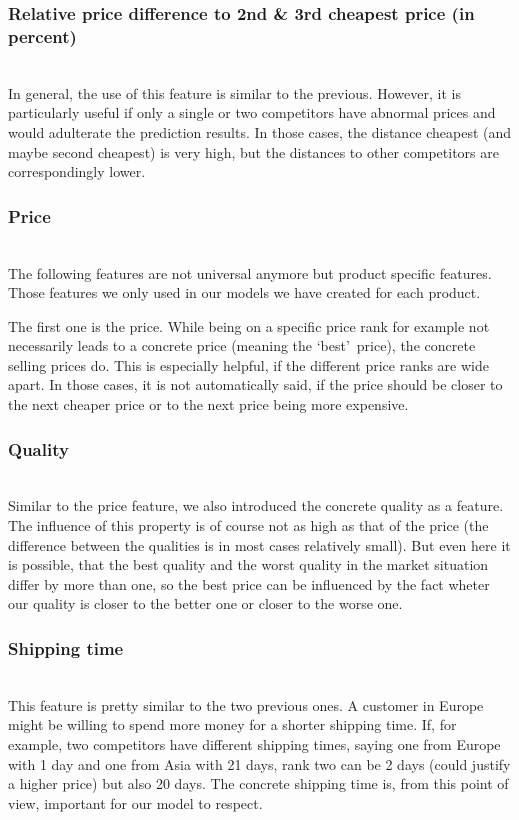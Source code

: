 \subsubsection{Relative price difference to 2nd \& 3rd cheapest price (in percent)}
\label{sec:pricediff3}
	~\\
	In general, the use of this feature is similar to the previous. However, it is particularly useful if only a single or two competitors have abnormal prices and would adulterate the prediction results. In those cases, the distance cheapest (and maybe second cheapest) is very high, but the distances to other competitors are correspondingly lower.
\subsubsection{Price}
	~\\
	The following features are not universal anymore but product specific features. Those features we only used in our models we have created for each product.

	The first one is the price. While being on a specific price rank for example not necessarily leads to a concrete price (meaning the \lq{best}\rq\ price), the concrete selling prices do. This is especially helpful, if the different price ranks are wide apart. In those cases, it is not automatically said, if the price should be closer to the next cheaper price or to the next price being more expensive.
\subsubsection{Quality}
	~\\
	Similar to the price feature, we also introduced the concrete quality as a feature. The influence of this property is of course not as high as that of the price (the difference between the qualities is in most cases relatively small). But even here it is possible, that the best quality and the worst quality in the market situation differ by more than one, so the best price can be influenced by the fact wheter our quality is closer to the better one or closer to the worse one.
\subsubsection{Shipping time}
	~\\
	This feature is pretty similar to the two previous ones. A customer in Europe might be willing to spend more money for a shorter shipping time. If, for example, two competitors have different shipping times, saying one from Europe with 1 day and one from Asia with 21 days, rank two can be 2 days (could justify a higher price) but also 20 days. The concrete shipping time is, from this point of view, important for our model to respect.
